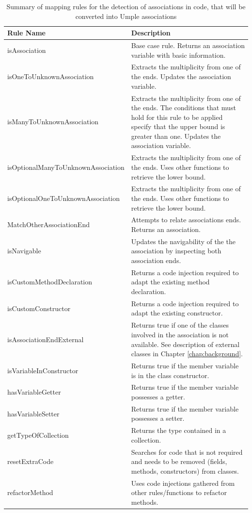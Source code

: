 \begin{table}[h]
\caption{Summary of mapping rules for the detection of associations in code, that will be converted into Umple associations}
\label{table:assocsRules}
\centering
	\begin{tabular}{l|p{8cm}}
		\toprule
		\rowcolor[HTML]{BBDAFF}
        \textbf{Rule Name} & \textbf{Description}  \\ \midrule
        isAssociation & Base case rule. Returns an association variable with basic information.  \\ \hline
        isOneToUnknownAssociation & Extracts the multiplicity from one of the ends. Updates the association variable.  \\ \hline
        isManyToUnknownAssociation &  Extracts the multiplicity from one of the ends. The conditions that must hold for this rule to be applied specify that the upper bound is greater than one. Updates the association variable.  \\ \hline
        isOptionalManyToUnknownAssociation & Extracts the multiplicity from one of the ends. Uses other functions to retrieve the lower bound. \\ \hline
        isOptionalOneToUnknownAssociation & Extracts the multiplicity from one of the ends. Uses other functions to retrieve the lower bound. \\ \hline
        MatchOtherAssociationEnd & Attempts to relate associations ends. Returns an association. \\ \hline
        isNavigable & Updates the navigability of the the association by inspecting both association ends.  \\ \hline
        isCustomMethodDeclaration & Returns a code injection required to adapt the existing method declaration.\\ \hline
        isCustomConstructor  & Returns a code injection required to adapt the existing constructor.  
\\ \hline
        isAssociationEndExternal & Returns true if one of the classes involved in the association is not available. See description of external classes in Chapter \ref{chap:background}.
\\   \hline
        isVariableInConstructor & Returns true if the member variable is in the class constructor.
\\    \hline
        hasVariableGetter & Returns true if the member variable possesses a getter. 
\\   \hline     
        hasVariableSetter & Returns true if the member variable possesses a setter. 
\\    \hline     
		getTypeOfCollection& Returns the type contained in a collection. 
\\    \hline       
		resetExtraCode & Searches for code that is not required and needs to be removed (fields, methods, constructors) from classes. 
\\  \hline 
 		refactorMethod & Uses code injections gathered from other rules/functions to refactor methods.\\ 
\bottomrule
\end{tabular}
\end{table}


